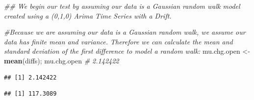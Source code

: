 \documentclass[]{article}
\newenvironment{Shaded}{\begin{snugshade}}{\end{snugshade}}
\newcommand{\CommentTok}[1]{\textcolor[rgb]{0.56,0.35,0.01}{\textit{#1}}}
\newcommand{\DataTypeTok}[1]{\textcolor[rgb]{0.13,0.29,0.53}{#1}}
\newcommand{\DecValTok}[1]{\textcolor[rgb]{0.00,0.00,0.81}{#1}}
\newcommand{\KeywordTok}[1]{\textcolor[rgb]{0.13,0.29,0.53}{\textbf{#1}}}
\newcommand{\NormalTok}[1]{#1}
\newcommand{\OperatorTok}[1]{\textcolor[rgb]{0.81,0.36,0.00}{\textbf{#1}}}
\newcommand{\StringTok}[1]{\textcolor[rgb]{0.31,0.60,0.02}{#1}}
\begin{document}
\begin{Shaded}
\begin{Highlighting}[]
\CommentTok{## We begin our test by assuming our data is a Gaussian random walk model created using a (0,1,0) Arima Time Series with a Drift.}

\CommentTok{#Because we are assuming our data is a Gaussian random walk, we assume our data has finite mean and variance. Therefore we can calculate the mean and standard deviation of the first difference to model a random walk:}
\NormalTok{mu.chg.open <-}\StringTok{ }\KeywordTok{mean}\NormalTok{(diffs); mu.chg.open }\CommentTok{# 2.142422 }
\end{Highlighting}
\end{Shaded}

\begin{verbatim}
## [1] 2.142422
\end{verbatim}

\begin{Shaded}
\end{Shaded}

\begin{verbatim}
## [1] 117.3089
\end{verbatim}

\begin{Shaded}
\end{Shaded}
\end{document}
